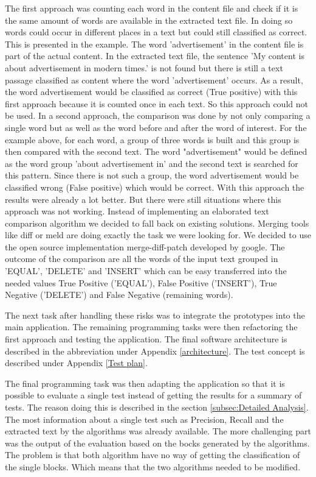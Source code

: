 The first approach was counting each word in the content file and check if it is the same amount of words are available in the extracted text file. In doing so words could occur in different places in a text but could still classified as correct. This is presented in the example. The word 'advertisement' in the content file is part of the actual content. In the extracted text file, the sentence 'My content is about advertisement in modern times.' is not found but there is still a text passage classified as content where the word 'advertisement' occurs. As a result, the word advertisement would be classified as correct (True positive) with this first approach because it is counted once in each text. So this approach could not be used.
In a second approach, the comparison was done by not only comparing a single word but as well as the word before and after the word of interest. 
For the example above, for each word, a group of three words is built and this group is then compared with the second text. The word "advertisement" would be defined as the word group 'about advertisement in' and the second text is searched for this pattern. Since there is not such a group, the word advertisement would be classified wrong (False positive) which would be correct. With this approach the results were already a lot better. But there were still situations where this approach was not working. Instead of implementing an elaborated text comparison algorithm we decided to fall back on existing solutions. Merging tools like diff \cite{wiki:diff} or meld \cite{wiki:meld} are doing exactly the task we were looking for. We decided to use the open source implementation merge-diff-patch \cite{google:diffMatchPatch} developed by google.  The outcome of the comparison are all the words of the input text grouped in 'EQUAL', 'DELETE' and 'INSERT' which can be easy transferred into the needed values True Positive ('EQUAL'), False Positive ('INSERT'), True Negative ('DELETE') and False Negative (remaining words). 


The next task after handling these risks was to integrate the prototypes into the main application. The remaining programming tasks were then refactoring the first approach and testing the application. The final software architecture is described in the abbreviation under Appendix \ref{architecture}. The test concept is described under Appendix \ref{Test plan}. 

The final programming task was then adapting the application so that it is possible to evaluate a single test instead of getting the results for a summary of tests. The reason doing this is described in the section \ref{subsec:Detailed Analysis}. 
The most information about a single test such as Precision, Recall and the extracted text by the algorithms was already available. The more challenging part was the output of the evaluation based on the bocks generated by the algorithms. The problem is that both algorithm have no way of getting the classification of the single blocks. Which means that the two algorithms needed to be modified.

